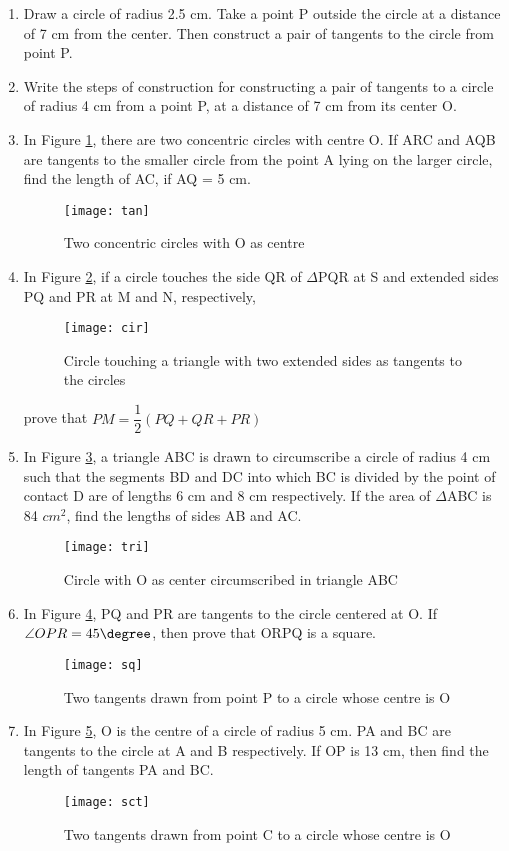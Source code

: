 \begin{enumerate}

	\item Draw a circle of radius 2.5 cm. Take a point P outside the circle at a distance of 7 cm from the center. Then construct a pair of tangents to the circle from point P.

	\item Write the steps of construction for constructing a pair of tangents to a circle of radius 4 cm from a point P, at a distance of 7 cm from its center O.

	\item In Figure \ref{fig:tan1}, there are two concentric circles with centre O. If ARC and AQB are tangents to the smaller circle  from the point A lying on the larger circle, find the length of AC, if AQ = 5 cm.
		\begin{figure}[H]
			\centering
			\texttt{[image: tan]}
			\caption{Two concentric circles with O as centre}
			\label{fig:tan1}
		\end{figure}
	
	\item In Figure \ref{fig:cir1}, if a circle touches the side QR of $\Delta$PQR at S and extended sides PQ and PR at M and N, respectively,
		\begin{figure}[H]
			\centering
			\texttt{[image: cir]}
				\caption{Circle touching a triangle with two extended sides as tangents to the circles}
				\label{fig:cir1}
		\end{figure}
		prove that $PM=\dfrac{1}{2}(PQ+QR+PR)$
	\item In Figure \ref{fig:tri1}, a triangle ABC is drawn to circumscribe a circle of radius 4 cm such that the segments BD and DC into which BC is divided by the point of contact D are of lengths 6 cm and 8 cm respectively. If the area of $\Delta$ABC is 84 $cm^2$, find the lengths of sides AB and AC.
		\begin{figure}[H]
			\centering
			\texttt{[image: tri]}
				\caption{Circle with O as center circumscribed in triangle ABC}
				\label{fig:tri1}
		\end{figure}
	\item In Figure \ref{fig:sq1}, PQ and PR are tangents to the circle centered at O. If $\angle OPR=45\degree$, then prove that ORPQ is a square.
		\begin{figure}[H]
			\centering
			\texttt{[image: sq]}
			\caption{Two tangents drawn from point P to a circle whose centre is O}
			\label{fig:sq1}
		\end{figure}
	\item In Figure \ref{fig:sct1}, O is the centre of a circle of radius 5 cm. PA and BC are tangents to the circle at A and B respectively. If OP is 13 cm, then find the length of tangents PA and BC.
		\begin{figure}[H]
			\centering
			\texttt{[image: sct]}
			\caption{Two tangents drawn from point C to a circle whose centre is O}
			\label{fig:sct1}
		\end{figure}


\end{enumerate}
